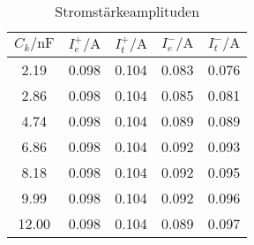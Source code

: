 \begin{table}
    \centering
    \caption{Stromstärkeamplituden}
    \label{tab:I}
    \begin{tabular}{c c c c c}
    \toprule
    $C_k / \si{\nano\farad}$ & $I_e^+ / \si{\ampere}$ & $I_t^+ / \si{\ampere}$ & $I_e^- / \si{\ampere}$ & $I_t^- / \si{\ampere}$ \\
    \midrule
     2.19 & 0.098 & 0.104 & 0.083 & 0.076 \\
     2.86 & 0.098 & 0.104 & 0.085 & 0.081 \\
     4.74 & 0.098 & 0.104 & 0.089 & 0.089 \\
     6.86 & 0.098 & 0.104 & 0.092 & 0.093 \\
     8.18 & 0.098 & 0.104 & 0.092 & 0.095 \\
     9.99 & 0.098 & 0.104 & 0.092 & 0.096 \\
    12.00 & 0.098 & 0.104 & 0.089 & 0.097 \\
    \bottomrule
    \end{tabular}
\end{table}




